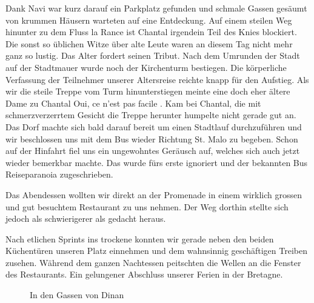 Dank Navi war kurz darauf ein Parkplatz gefunden und schmale Gassen gesäumt von krummen Häusern warteten auf eine Entdeckung.
Auf einem steilen Weg hinunter zu dem Fluss \glqq la Rance\grqq{} ist Chantal irgendein Teil des Knies blockiert.
Die sonst so üblichen Witze über alte Leute waren an diesem Tag nicht mehr ganz so lustig.
Das Alter fordert seinen Tribut.
Nach dem Umrunden der Stadt auf der Stadtmauer wurde noch der Kirchenturm bestiegen.
Die körperliche Verfassung der Teilnehmer unserer Altersreise reichte knapp für den Aufstieg.
Als wir die steile Treppe vom Turm hinunterstiegen meinte eine doch eher ältere Dame zu Chantal \glqq Oui, ce n'est pas facile \grqq{}.
Kam bei Chantal, die mit schmerzverzerrtem Gesicht die Treppe herunter humpelte nicht gerade gut an.
Das Dorf machte sich bald darauf bereit um einen Stadtlauf durchzuführen und wir beschlossen uns mit dem Bus wieder Richtung St. Malo zu begeben.
Schon auf der Hinfahrt fiel uns ein ungewohntes Geräusch auf, welches sich auch jetzt wieder bemerkbar machte.
Das wurde fürs erste ignoriert und der bekannten Bus Reiseparanoia zugeschrieben.

Das Abendessen wollten wir direkt an der Promenade in einem wirklich grossen und gut besuchtem Restaurant zu uns nehmen.
Der Weg dorthin stellte sich jedoch als schwierigerer als gedacht heraus.

Nach etlichen Sprints ins trockene konnten wir gerade neben den beiden Küchentüren unseren Platz einnehmen und dem wahnsinnig geschäftigen Treiben zusehen.
Während dem ganzen Nachtessen peitschten die Wellen an die Fenster des Restaurants.
Ein gelungener Abschluss unserer Ferien in der Bretagne.

\begin{figure}[H]
   \centering
   \quad
   \quad
   \quad
   \caption[In den Gassen von Dinan]{In den Gassen von Dinan}
\end{figure}

